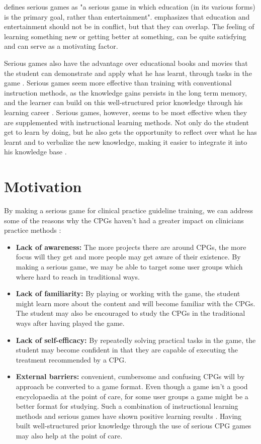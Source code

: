 \textcite{Michael2006} defines serious games as "a serious game in which education (in its various forms) is the primary goal, rather than entertainment". \textcite{Michael2006} emphasizes that education and entertainment should not be in conflict, but that they can overlap. The feeling of learning something new or getting better at something, can be quite satisfying and can serve as a motivating factor.

Serious games also have the advantage over educational books and movies that the student can demonstrate and apply what he has learnt, through tasks in the game \parencite{Michael2006}.    Serious games seem more effective than training with conventional instruction methods, as the knowledge gains persists in the long term memory, and the learner can build on this well-structured prior knowledge through his learning career \parencite{Wouters2013}. Serious games, however, seems to be most effective when they are supplemented with instructional learning methods. Not only do the student get to learn by doing, but he also gets the opportunity to reflect over what he has learnt and to verbalize the new knowledge, making it easier to integrate it into his knowledge base \parencite{Wouters2013}. 





\section{Motivation}
By making a serious game for clinical practice guideline training, we can address some of the reasons why the CPGs haven't had a greater impact on clinicians practice methods \parencite{Cabana1999}:
\begin{itemize}
	\item \textbf{Lack of awareness:} The more projects there are around CPGs, the more focus will they get and more people may get aware of their existence. By making a serious game, we may be able to target some user groups which where hard to reach in traditional ways. 
	\item \textbf{Lack of familiarity:} By playing or working with the game, the student might learn more about the content and will become familiar with the CPGs. The student may also be encouraged to study the CPGs in the traditional ways after having played the game.  
	\item \textbf{Lack of self-efficacy:} By repeatedly solving practical tasks in the game, the student may become confident in that they are capable of executing the treatment recommended by a CPG.
	\item \textbf{External barriers:} convenient, cumbersome and confusing CPGs will by approach be converted to a game format. Even though a game isn't a good encyclopaedia at the point of care, for some user groups a game might be a better format for studying. Such a combination of instructional learning methods and serious games have shown positive learning results \parencite{Wouters2013}. Having built well-structured prior knowledge through the use of serious CPG games may also help at the point of care.
\end{itemize}

